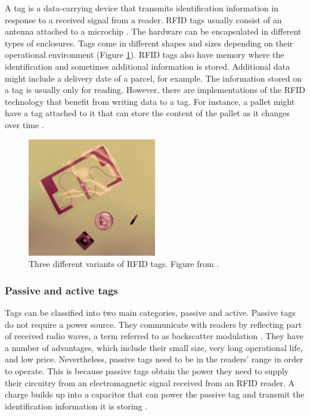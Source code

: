 A tag is a data-carrying device that transmits identification information in response to a received signal from a reader. RFID tags usually consist of an antenna attached to a microchip \cite[p. 2]{Want2006}. The hardware can be encapsulated in different types of enclosures. Tags come in different shapes and sizes depending on their operational environment (Figure \ref{fig:rfidtags}). RFID tags also have memory where the identification and sometimes additional information is stored. Additional data might include a delivery date of a parcel, for example. The information stored on a tag is usually only for reading. However, there are implementations of the RFID technology that benefit from writing data to a tag. For instance, a pallet might have a tag attached to it that can store the content of the pallet as it changes over time \cite[p. 8]{Hunt2007}.

\begin{figure}[h]
	\begin{center}
		\includegraphics[width=0.5\textwidth]{figures/rfidtags}
		\caption{Three different variants of RFID tags. Figure from \cite{Want2006}.}
		\label{fig:rfidtags}
	\end{center}
\end{figure}

\subsubsection{Passive and active tags}

Tags can be classified into two main categories, passive and active. Passive tags do not require a power source. They communicate with readers by reflecting part of received radio waves, a term referred to as backscatter modulation \cite{Bolic2010}. They have a number of advantages, which include their small size, very long operational life, and low price. Nevertheless, passive tags need to be in the readers' range in order to operate. This is because passive tags obtain the power they need to supply their circuitry from an electromagnetic signal received from an RFID reader. A charge builds up into a capacitor that can power the passive tag and transmit the identification information it is storing \cite{Weinstein2005}.

